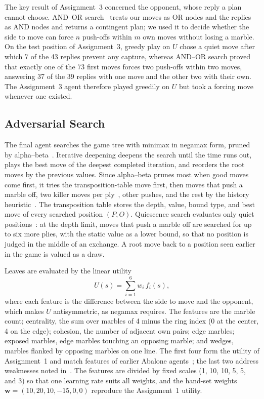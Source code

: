 \documentclass[conference,a4paper]{IEEEtran}
\begin{document}
The key result of Assignment~3 concerned the opponent, whose reply a plan cannot choose. AND--OR search~\cite{russell2021} treats our moves as OR nodes and the replies as AND nodes and returns a contingent plan; we used it to decide whether the side to move can force $n$ push-offs within $m$ own moves without losing a marble. On the test position of Assignment~3, greedy play on $U$ chose a quiet move after which 7 of the 43 replies prevent any capture, whereas AND--OR search proved that exactly one of the 73 first moves forces two push-offs within two moves, answering 37 of the 39 replies with one move and the other two with their own. The Assignment~3 agent therefore played greedily on $U$ but took a forcing move whenever one existed.

\subsection{Adversarial Search}
The final agent searches the game tree with minimax in negamax form, pruned by alpha--beta~\cite{knuth1975}. Iterative deepening deepens the search until the time runs out, plays the best move of the deepest completed iteration, and reorders the root moves by the previous values. Since alpha--beta prunes most when good moves come first, it tries the transposition-table move first, then moves that push a marble off, two killer moves per ply~\cite{akl1977}, other pushes, and the rest by the history heuristic~\cite{schaeffer1989}. The transposition table stores the depth, value, bound type, and best move of every searched position $(P,O)$. Quiescence search evaluates only quiet positions~\cite{russell2021}: at the depth limit, moves that push a marble off are searched for up to six more plies, with the static value as a lower bound, so that no position is judged in the middle of an exchange. A root move back to a position seen earlier in the game is valued as a draw.

Leaves are evaluated by the linear utility
\begin{equation}
U(s) = \sum_{i=1}^{6} w_i\, f_i(s), \label{eq:u}
\end{equation}
where each feature is the difference between the side to move and the opponent, which makes $U$ antisymmetric, as negamax requires. The features are the marble count; centrality, the sum over marbles of 4 minus the ring index (0 at the center, 4 on the edge); cohesion, the number of adjacent own pairs; edge marbles; exposed marbles, edge marbles touching an opposing marble; and wedges, marbles flanked by opposing marbles on one line. The first four form the utility of Assignment~1 and match features of earlier Abalone agents~\cite{ozcan2004,lemmens2005}; the last two address weaknesses noted in~\cite{lemmens2005}. The features are divided by fixed scales (1, 10, 10, 5, 5, and 3) so that one learning rate suits all weights, and the hand-set weights $\mathbf{w}=(10,20,10,-15,0,0)$ reproduce the Assignment~1 utility.
\end{document}
